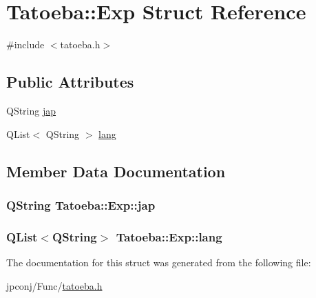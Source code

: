\hypertarget{struct_tatoeba_1_1_exp}{}\section{Tatoeba\+:\+:Exp Struct Reference}
\label{struct_tatoeba_1_1_exp}


{\ttfamily \#include $<$tatoeba.\+h$>$}

\subsection*{Public Attributes}
\begin{DoxyCompactItemize}
\item 
Q\+String \hyperlink{struct_tatoeba_1_1_exp_a6aedde568a43468dcd805cbb54b116d5}{jap}
\item 
Q\+List$<$ Q\+String $>$ \hyperlink{struct_tatoeba_1_1_exp_ace9271a99787d348081203b07718ab0e}{lang}
\end{DoxyCompactItemize}


\subsection{Member Data Documentation}
\subsubsection[{\texorpdfstring{jap}{jap}}]{\setlength{\rightskip}{0pt plus 5cm}Q\+String Tatoeba\+::\+Exp\+::jap}\hypertarget{struct_tatoeba_1_1_exp_a6aedde568a43468dcd805cbb54b116d5}{}\label{struct_tatoeba_1_1_exp_a6aedde568a43468dcd805cbb54b116d5}
\subsubsection[{\texorpdfstring{lang}{lang}}]{\setlength{\rightskip}{0pt plus 5cm}Q\+List$<$Q\+String$>$ Tatoeba\+::\+Exp\+::lang}\hypertarget{struct_tatoeba_1_1_exp_ace9271a99787d348081203b07718ab0e}{}\label{struct_tatoeba_1_1_exp_ace9271a99787d348081203b07718ab0e}


The documentation for this struct was generated from the following file\+:\begin{DoxyCompactItemize}
\item 
jpconj/\+Func/\hyperlink{tatoeba_8h}{tatoeba.\+h}\end{DoxyCompactItemize}
